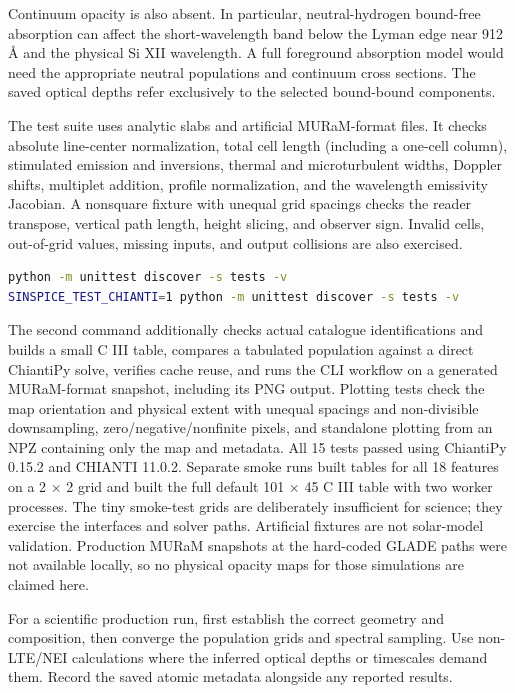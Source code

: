 \documentclass[
]{article}
\begin{document}
Continuum opacity is also absent. In particular, neutral-hydrogen
bound-free absorption can affect the short-wavelength band below the
Lyman edge near 912 Å and the physical Si XII wavelength. A full
foreground absorption model would need the appropriate neutral
populations and continuum cross sections. The saved optical depths refer
exclusively to the selected bound-bound components.

The test suite uses analytic slabs and artificial MURaM-format files. It
checks absolute line-center normalization, total cell length (including
a one-cell column), stimulated emission and inversions, thermal and
microturbulent widths, Doppler shifts, multiplet addition, profile
normalization, and the wavelength emissivity Jacobian. A nonsquare
fixture with unequal grid spacings checks the reader transpose, vertical
path length, height slicing, and observer sign. Invalid cells,
out-of-grid values, missing inputs, and output collisions are also
exercised.

\begin{lstlisting}[language=bash]
python -m unittest discover -s tests -v
SINSPICE_TEST_CHIANTI=1 python -m unittest discover -s tests -v
\end{lstlisting}

The second command additionally checks actual catalogue identifications
and builds a small C III table, compares a tabulated population against
a direct ChiantiPy solve, verifies cache reuse, and runs the CLI
workflow on a generated MURaM-format snapshot, including its PNG output.
Plotting tests check the map orientation and physical extent with unequal
spacings and non-divisible downsampling, zero/negative/nonfinite pixels, and
standalone plotting from an NPZ containing only the map and metadata.
All 15 tests passed using
ChiantiPy 0.15.2 and CHIANTI 11.0.2. Separate smoke runs built tables
for all 18 features on a 2 × 2 grid and built the full default 101 × 45
C III table with two worker processes. The tiny smoke-test grids are
deliberately insufficient for science; they exercise the interfaces and
solver paths. Artificial fixtures are not solar-model validation.
Production MURaM snapshots at the hard-coded GLADE paths were not
available locally, so no physical opacity maps for those simulations are
claimed here.

For a scientific production run, first establish the correct geometry
and composition, then converge the population grids and spectral
sampling. Use non-LTE/NEI calculations where the inferred optical depths
or timescales demand them. Record the saved atomic metadata alongside
any reported results.
\end{document}
